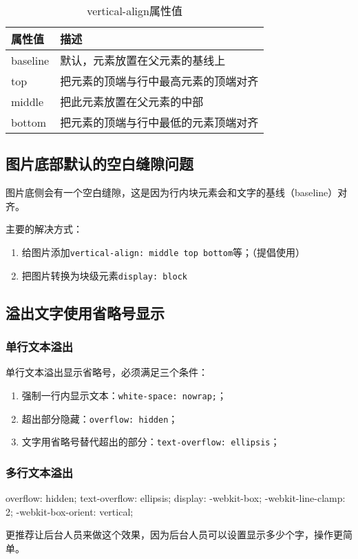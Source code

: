 \begin{table}[H]
    \caption{vertical-align属性值}
    \centering\begin{tabular}{ll}
        \hline
        属性值      & 描述                 \\
        \hline
        baseline & 默认，元素放置在父元素的基线上    \\
        top      & 把元素的顶端与行中最高元素的顶端对齐 \\
        middle   & 把此元素放置在父元素的中部      \\
        bottom   & 把元素的顶端与行中最低的元素顶端对齐 \\
        \hline
    \end{tabular}

\end{table}

\subsection{图片底部默认的空白缝隙问题}
图片底侧会有一个空白缝隙，这是因为行内块元素会和文字的基线（baseline）对齐。

主要的解决方式：
\begin{enumerate}
    \item 给图片添加\verb|vertical-align: middle top bottom|等；（提倡使用）
    \item 把图片转换为块级元素\verb|display: block|
\end{enumerate}
\subsection{溢出文字使用省略号显示}
\subsubsection{单行文本溢出}
单行文本溢出显示省略号，必须满足三个条件：
\begin{enumerate}
    \item 强制一行内显示文本：\verb|white-space: nowrap;|；
    \item 超出部分隐藏：\verb|overflow: hidden|；
    \item 文字用省略号替代超出的部分：\verb|text-overflow: ellipsis|；
\end{enumerate}
\subsubsection{多行文本溢出}
\begin{css}
    overflow: hidden;
    text-overflow: ellipsis;
    display: -webkit-box;
    -webkit-line-clamp: 2;
    -webkit-box-orient: vertical;
\end{css}
更推荐让后台人员来做这个效果，因为后台人员可以设置显示多少个字，操作更简单。

